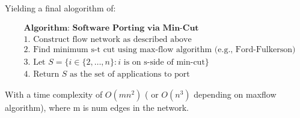 \documentclass[
]{article}
\begin{document}
Yielding a final alogorithm of:

\[
\begin{align} &\textbf{Algorithm: Software Porting via Min-Cut} \\ &\text{1. Construct flow network as described above} \\ &\text{2. Find minimum s-t cut using max-flow algorithm (e.g., Ford-Fulkerson)} \\ &\text{3. Let } S = \{i \in \{2, \dots, n\} : i \text{ is on s-side of min-cut}\} \\ &\text{4. Return } S \text{ as the set of applications to port} \end{align}
\]

With a time complexity of \(O(mn^2)\) ( or \(O(n^3)\) depending on
maxflow algorithm), where m is num edges in the network.
\end{document}
